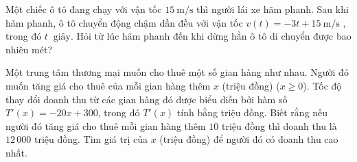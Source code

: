 \begin{bt}%
	Một chiếc ô tô đang chạy với vận tốc $15~\mathrm{m/s}$ thì người lái xe hãm phanh. Sau khi hãm phanh, ô tô chuyển động chậm dần đều với vận tốc $v(t)=-3t+15~\mathrm{m/s}$ , trong đó $t~\text{ giây}$. Hỏi từ lúc hãm phanh đến khi dừng hẳn ô tô di  chuyển được bao nhiêu mét?
\end{bt}

\begin{bt}%
	Một trung tâm thương mại muốn cho thuê một số gian hàng như nhau. Người đó muốn tăng giá cho  thuê của mỗi gian hàng thêm $x$ (triệu đồng) ($x \geq 0$). Tốc độ thay đổi doanh thu từ các gian hàng đó được biểu diễn bởi hàm số $T'(x) = -20x + 300$, trong đó $T'(x)$ tính bằng triệu đồng. Biết rằng nếu người đó tăng giá cho thuê mỗi gian hàng thêm $10$ triệu đồng thì doanh thu là $12\,000$ triệu đồng. Tìm giá trị của $x$ (triệu đồng) để người đó có doanh thu cao nhất.
\end{bt}

